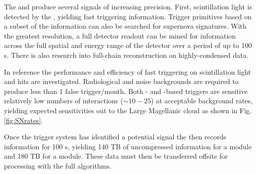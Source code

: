 \documentclass[../main-v1.tex]{subfiles}
\begin{document}



The  and  produce several signals of increasing precision.  First, scintillation light is detected by the , yielding fast triggering information.  Trigger primitives based on a subset of the  information can also be searched for supernova signatures.  With the greatest resolution, a full detector readout can be mined for information across the full spatial and energy range of the detector over a period of up to 100 s.  There is also research into full-chain reconstruction on highly-condensed data. %

In reference \cite{DUNE:2020zfm} the performance and efficiency of fast triggering on scintillation light and  hits are investigated.  Radiological and noise backgrounds are required to produce less than 1 false trigger/month. Both - and -based triggers are sensitive relatively low numbers of interactions ($\sim10-25$) at acceptable background rates, yielding expected sensitivities out to the Large Magellanic cloud as shown in Fig. \ref{fig:SNrates}.

Once the trigger system has identified a potential  signal  the  then records information for 100 s, yielding 140 TB of uncompressed information for a  module and 180 TB for a  module.  These data must then be transferred offsite for processing with the full algorithms. 
\end{document}
